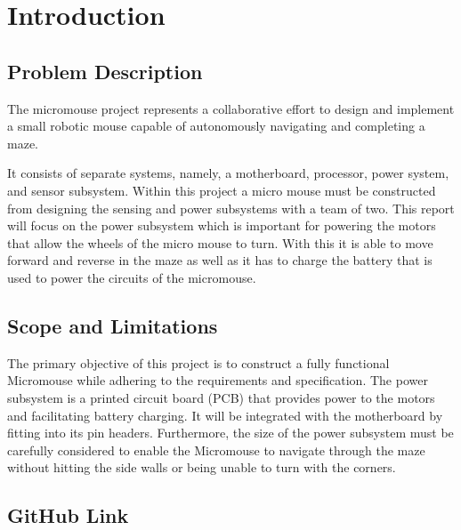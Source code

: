 \documentclass[class=report,11pt,crop=false]{standalone}
\begin{document}
\chapter{Introduction} \label{ch:introduction}
\vspace{-1cm}

\section{Problem Description}

The micromouse project represents a collaborative effort to design and implement a small robotic mouse capable of autonomously navigating and completing a maze.

It consists of separate systems, namely, a motherboard, processor, power system, and sensor subsystem. Within this project a micro mouse must be constructed from designing the sensing and power subsystems with a team of two. This report will focus on the power subsystem which is important for powering the motors that allow the wheels of the micro mouse to turn. With this it is able to move forward and reverse in the maze as well as it has to charge the battery that is used to power the circuits of the micromouse. 

\section{Scope and Limitations}
The primary objective of this project is to construct a fully functional Micromouse while adhering to the requirements and specification. The power subsystem is a printed circuit board (PCB) that provides power to the motors and facilitating battery charging. It will be integrated with the motherboard by fitting into its pin headers. Furthermore, the size of the power subsystem must be carefully considered to enable the Micromouse to navigate through the maze without hitting the side walls or being unable to turn with the corners.

\section{GitHub Link}

\ifstandalone

\fi
\end{document}

